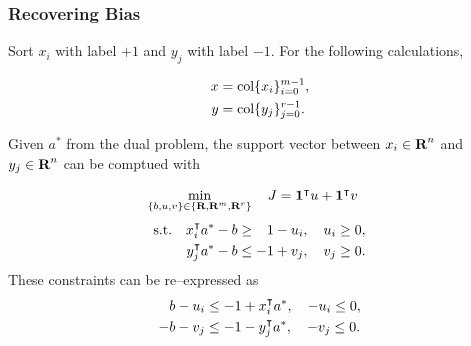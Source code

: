 \documentclass{article}
\begin{document}
\subsubsection{Recovering Bias}

    Sort $x_i$ with label $+1$ 
    and $y_j$ with label $-1$.
    For the following calculations,

    \begin{align*}
        x &= \text{col}\{x_i\}_{i=0}^{m-1},
        \\
        y &= \text{col}\{y_j\}_{j=0}^{r-1}.
    \end{align*}

    Given $a^*$ from the dual problem, 
    the support vector between $x_i\in\textbf{R}^n$ and $y_j\in\textbf{R}^n$
    can be comptued with

    \begin{align*}
        \min_{\{b,u,v\}\in\{\textbf{R},\textbf{R}^m,\textbf{R}^r\}} \quad 
        J & = \textbf{1}^\intercal u + \textbf{1}^\intercal v
    \end{align*}
    \begin{align*}
        \st\quad x_i^\tp a^* - b &\geq \minus 1-u_i,\quad u_i\geq 0,\\
                y_j^\tp a^* - b &\leq -1+v_j,\quad v_j\geq 0.
    \end{align*}    
    These constraints can be re--expressed as
    \begin{align*}
        b - u_i &\leq -1+x_i^\intercal a^*,\quad -u_i\leq 0,\\
        - b -v_j &\leq -1-y_j^\intercal a^*,\quad -v_j\leq 0.
    \end{align*}   
    
\end{document}
